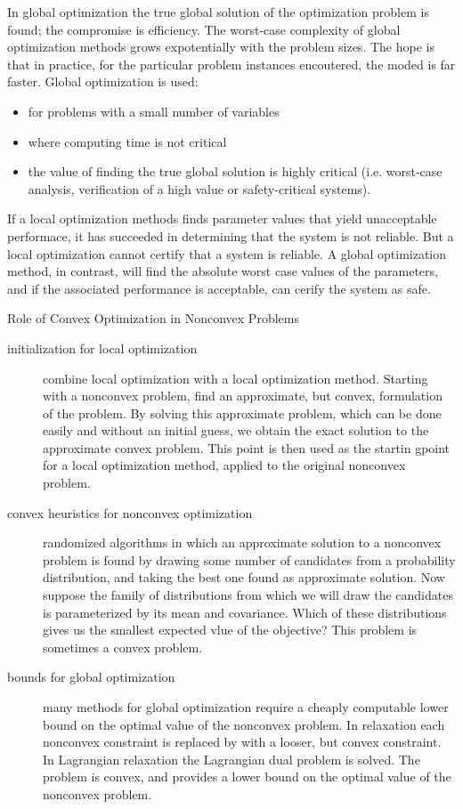 \documentclass{beamer}
\begin{document}
\begin{frame}{}
In global optimization the true global solution of the optimization problem is found; the compromise is efficiency. The worst-case complexity of global optimization methods grows expotentially with the problem sizes. The hope is that in practice, for the particular problem instances encoutered, the moded is far faster.
Global optimization is used:
\begin{itemize}
\item for problems with a small number of variables
\item where computing time is not critical
\item the value of finding the true global solution is highly critical (i.e. worst-case analysis, verification of a high value or safety-critical systems).
\end{itemize}
If a local optimization methods finds parameter values that yield unacceptable performace, it has succeeded in determining that the system is not reliable. But a local optimization cannot certify that a system is reliable. A global optimization method, in contrast, will find the absolute worst case values of the parameters, and if the associated performance is acceptable, can cerify the system as safe.
\end{frame}


\begin{frame}{Role of Convex Optimization in Nonconvex Problems}
\begin{description}
\item [initialization for local optimization] combine local optimization with a local optimization method. Starting with a nonconvex problem, find an approximate, but convex, formulation of the problem. By solving this approximate problem, which can be done easily and without an initial guess, we obtain the exact solution to the approximate convex problem. This point is then used as the startin gpoint for a local optimization method, applied to the original nonconvex problem.
\item [convex heuristics for nonconvex optimization]
randomized algorithms in which an approximate solution to a nonconvex problem is found by drawing some number of candidates from a probability distribution, and taking the best one found as approximate solution. Now suppose the family of distributions from which we will draw the candidates is parameterized by its mean and covariance. Which of these distributions gives us the smallest expected vlue of the objective? This problem is sometimes a convex problem.
\item [bounds for global optimization] many methods for global optimization require a cheaply computable lower bound on the optimal value of the nonconvex problem. In relaxation each nonconvex constraint is replaced by with a looser, but convex constraint. In Lagrangian relaxation the Lagrangian dual problem is solved. The problem is convex, and provides a lower bound on the optimal value of the nonconvex problem.
\end{description}
\end{frame}
\end{document}
